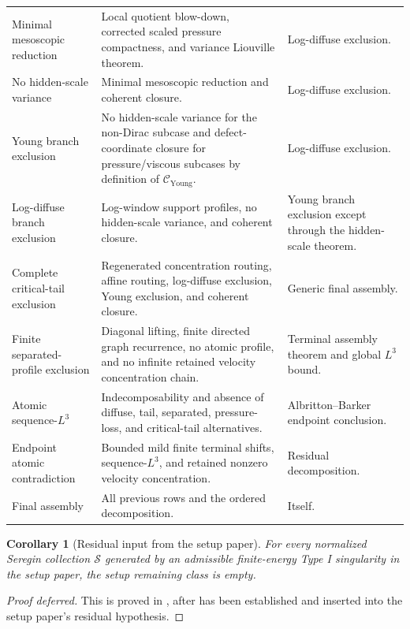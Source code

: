 \documentclass[11pt]{amsart}
\numberwithin{equation}{section}
\theoremstyle{plain}
\newtheorem{corollary}[corollary]{Corollary}
\theoremstyle{definition}
\theoremstyle{remark}
\newcommand{\calS}{\mathcal S}
\newcommand{\Cyoung}{\mathcal C_{\mathrm{Young}}}
\begin{document}
\begin{longtable}{@{}L{0.24\textwidth}L{0.45\textwidth}L{0.23\textwidth}@{}}
Minimal mesoscopic reduction &
Local quotient blow-down, corrected scaled pressure compactness, and variance
Liouville theorem. &
Log-diffuse exclusion.\\
No hidden-scale variance &
Minimal mesoscopic reduction and coherent closure. &
Log-diffuse exclusion.\\
Young branch exclusion &
No hidden-scale variance for the non-Dirac subcase and defect-coordinate closure
for pressure/viscous subcases by definition of \(\Cyoung\). &
Log-diffuse exclusion.\\
Log-diffuse branch exclusion &
Log-window support profiles, no hidden-scale variance, and coherent closure. &
Young branch exclusion except through the hidden-scale theorem.\\
Complete critical-tail exclusion &
Regenerated concentration routing, affine routing, log-diffuse exclusion, Young
exclusion, and coherent closure. &
Generic final assembly.\\
Finite separated-profile exclusion &
Diagonal lifting, finite directed graph recurrence, no atomic profile, and no
infinite retained velocity concentration chain. &
Terminal assembly theorem and global \(L^3\) bound.\\
Atomic sequence-\(L^3\) &
Indecomposability and absence of diffuse, tail, separated, pressure-loss, and
critical-tail alternatives. &
Albritton--Barker endpoint conclusion.\\
Endpoint atomic contradiction &
Bounded mild finite terminal shifts, sequence-\(L^3\), and retained nonzero
velocity concentration. &
Residual decomposition.\\
Final assembly &
All previous rows and the ordered decomposition. &
Itself.\\
\hline
\end{longtable}

\begin{corollary}[Residual input from the setup paper]
\label{cor:paperI-residual-input}
For every normalized Seregin collection \(\calS\) generated by an
admissible finite-energy Type I singularity in the setup paper, the setup
remaining class is empty.
\end{corollary}

\begin{proof}[Proof deferred]
This is proved in , after
 has been established and inserted into the
setup paper's residual hypothesis.
\end{proof}
\end{document}
